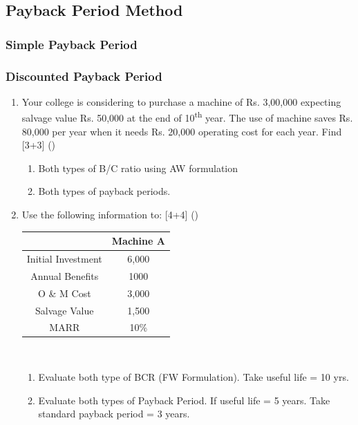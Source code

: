 \documentclass[12pt]{article}
\newcommand{\super}[1]{\textsuperscript{#1}}
\begin{document}
	\subsection{Payback Period Method}
		\subsubsection{Simple Payback Period}
		\subsubsection{Discounted Payback Period}
			\begin{enumerate}
				\item Your college is considering to purchase a machine of Rs. 3,00,000 expecting salvage value Rs. 50,000 at the end of 10\super{th} year. The use of machine saves Rs. 80,000 per year when it needs Rs. 20,000 operating cost for each year. Find \hfill [3+3] ()
				\begin{enumerate}[noitemsep, topsep = 0pt, label = \alph*]
					\item Both types of B/C ratio using AW formulation
					\item Both types of payback periods.
				\end{enumerate}

				\item Use the following information to: \hfill [4+4] ()\\
				\begin{tabular}{|c|c|}
					\hline
					& Machine A\\ \hline
					Initial Investment & 6,000 \\ \hline
					Annual Benefits & 1000 \\ \hline
					O \& M Cost & 3,000 \\ \hline
					Salvage Value & 1,500 \\ \hline
					MARR & 10\% \\ \hline
				\end{tabular}\\
					\begin{enumerate}[noitemsep, topsep=0pt, label = \alph*.]
						\item Evaluate both type of BCR (FW Formulation). Take useful life = 10 yrs.
						\item Evaluate both types of Payback Period. If useful life = 5 years. Take standard payback period = 3 years.
					\end{enumerate}


\end{enumerate}
\end{document}

